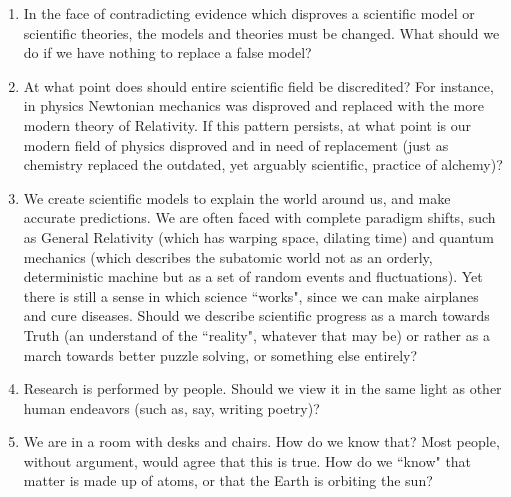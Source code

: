 \documentclass[12pt]{article}
\begin{document}
\begin{enumerate}
	\item In the face of contradicting evidence which disproves a scientific model or scientific theories, the models and theories must be changed. What should we do if we have nothing to replace a false model?
	\vspace{2in}
	\item At what point does should entire scientific field be discredited? For instance, in physics Newtonian mechanics was disproved and replaced with the more modern theory of Relativity. If this pattern persists, at what point is our modern field of physics disproved and in need of replacement (just as chemistry replaced the outdated, yet arguably scientific, practice of alchemy)?
	\vspace{2in}
	\clearpage
	
	\item We create scientific models to explain the world around us, and make accurate predictions. We are often faced with complete paradigm shifts, such as General Relativity (which has warping space, dilating time) and quantum mechanics (which describes the subatomic world not as an orderly, deterministic machine but as a set of random events and fluctuations). Yet there is still a sense in which science ``works", since we can make airplanes and cure diseases. Should we describe scientific progress as a march towards Truth (an understand of the ``reality", whatever that may be) or rather as a march towards better puzzle solving, or something else entirely?
	\vspace{2in}
	
	\item Research is performed by people. Should we view it in the same light as other human endeavors (such as, say, writing poetry)?
	\vspace{2in}
	
	\item We are in a room with desks and chairs. How do we know that? Most people, without argument, would agree that this is true. How do we ``know" that matter is made up of atoms, or that the Earth is orbiting the sun?
	\vspace{2in}
\end{enumerate}
\end{document}

